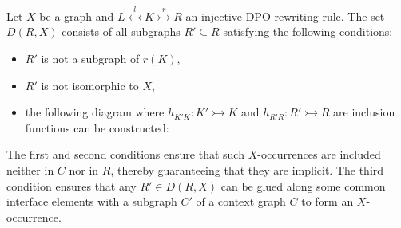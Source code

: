\begin{definition}
    \label{subgraph_counting:def:rx}
    Let \(X\) be a graph and 
    \(
        L \overset{l}{\leftarrowtail} K \overset{r}{\rightarrowtail} R
    \) an injective DPO rewriting rule.
    The set \(D(R,X)\) consists of all subgraphs \( R' \mathop{\subseteq} R \)
    satisfying the following conditions:
    \begin{itemize}
        \item $R'$ is not a subgraph of $r(K)$,
        \item $R'$ is not isomorphic to $X$,
        \item the following diagram where \(h_{K'K} \mathop{\colon} K' \rightarrowtail K \) and \(h_{R'R} \mathop{\colon} R' \rightarrowtail R \) are inclusion functions can be constructed:
        \begin{center}
        \end{center}
    \end{itemize}
\end{definition}  
The first and second conditions ensure that such $X$-occurrences are included neither in \( C \) nor in \( R \), thereby guaranteeing that they are implicit.
The third condition ensures that any $R' \mathop{\in} D(R,X)$ can be glued along some common interface elements with a subgraph $C'$ of a context graph \( C \) to form an \( X \)-occurrence. 


